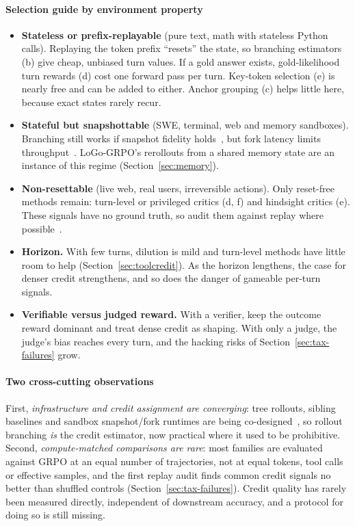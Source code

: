 \paragraph{Selection guide by environment property}
\begin{itemize}
  \item \textbf{Stateless or prefix-replayable} (pure text, math with stateless Python calls). Replaying the token prefix ``resets'' the state, so branching estimators (b) give cheap, unbiased turn values. If a gold answer exists, gold-likelihood turn rewards (d) cost one forward pass per turn. Key-token selection (e) is nearly free and can be added to either. Anchor grouping (c) helps little here, because exact states rarely recur.
  \item \textbf{Stateful but snapshottable} (SWE, terminal, web and memory sandboxes). Branching still works if snapshot fidelity holds~\citep{bpo2026branching}, but fork latency limits throughput~\citep{deltabox2026}. LoGo-GRPO's rerollouts from a shared memory state are an instance of this regime (Section~\ref{sec:memory}).
  \item \textbf{Non-resettable} (live web, real users, irreversible actions). Only reset-free methods remain: turn-level or privileged critics (d, f) and hindsight critics (e). These signals have no ground truth, so audit them against replay where possible~\citep{zhang2026credit}.
  \item \textbf{Horizon.} With few turns, dilution is mild and turn-level methods have little room to help (Section~\ref{sec:toolcredit}). As the horizon lengthens, the case for denser credit strengthens, and so does the danger of gameable per-turn signals.
  \item \textbf{Verifiable versus judged reward.} With a verifier, keep the outcome reward dominant and treat dense credit as shaping. With only a judge, the judge's bias reaches every turn, and the hacking risks of Section~\ref{sec:tax-failures} grow.
\end{itemize}

\paragraph{Two cross-cutting observations}
First, \emph{infrastructure and credit assignment are converging}: tree rollouts, sibling baselines and sandbox snapshot/fork runtimes are being co-designed~\citep{ji2025tree,bpo2026branching,deltabox2026,crab2026}, so rollout branching \emph{is} the credit estimator, now practical where it used to be prohibitive. Second, \emph{compute-matched comparisons are rare}: most families are evaluated against GRPO at an equal number of trajectories, not at equal tokens, tool calls or effective samples, and the first replay audit finds common credit signals no better than shuffled controls (Section~\ref{sec:tax-failures}). Credit quality has rarely been measured directly, independent of downstream accuracy, and a protocol for doing so is still missing.
